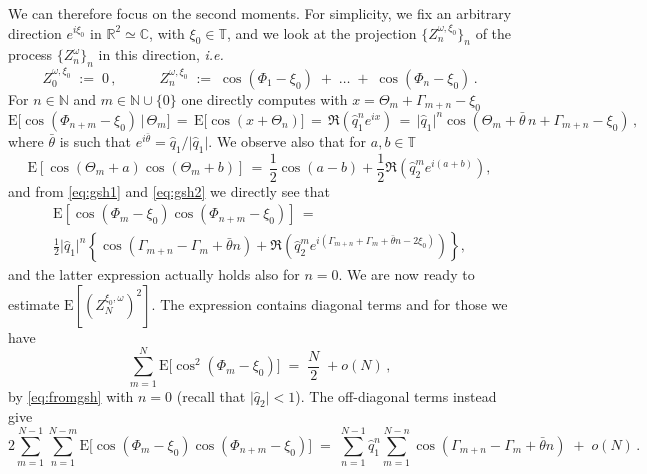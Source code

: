 \documentclass[a4paper,reqno,11pt]{amsart}
\numberwithin{equation}{section}
\newcommand{\bbT}{{\ensuremath{\mathbb T}} }
\newcommand{\go}{\omega}
\newcommand{\R}{\mathbb{R}}
\newcommand{\C}{\mathbb{C}}
\newcommand{\N}{\mathbb{N}}
\def\bE{\ensuremath{\bs{\mathrm{E}}}}
\def\bs{\boldsymbol}
\begin{document}
We can therefore focus on the second moments.
For simplicity, we fix an arbitrary direction $e^{i\xi_0}$
in $\R^2 \simeq \C$, with $\xi_0 \in \bbT$,
and we look at the projection
$\{Z^{\go, \xi_0}_n\}_n$ of the process $\{Z^\go_n\}_n$
in this direction, {\sl i.e.}
\begin{equation}
    Z^{\go, \xi_0}_0 \;:=\; 0\,  , \qquad \quad Z^{\go, \xi_0}_n \;:=\; \cos(\Phi_1 - \xi_0)
    \;+\; \ldots \;+\; \cos(\Phi_n-\xi_0)\,.
\end{equation}
For $n\in\N$ and $m\in \N\cup\{0\}$
one directly computes with $x=\Theta_m + \Gamma_{m+n}-\xi_0$
\begin{equation}
\label{eq:gsh1}
\bE \big[ \cos(\Phi_{n+m}-\xi_0) \,\big|\, \Theta_m \big] \,=\,
    \bE \big[ \cos(x+\Theta_n) \big]
    \,=\, \Re \left( \hat q_1^n e^{ix}\right) \, =\,
    \vert \hat q_1\vert ^n \cos(\Theta_m + \bar \theta \,n+ \Gamma_{m+n}-\xi_0)\,,
\end{equation}
where $\bar \theta$ is such that
$e^{i \bar \theta} = \hat q_1/\vert \hat q_1\vert$.
We observe also that for $a,b\in \bbT$
\begin{equation}
\label{eq:gsh2}
\bE \left[  \cos(\Theta_{m}+a)\cos(\Theta_{m}+b) \right] \,=\,
\frac 12 \cos (a-b) + \frac 12 \Re \left( \hat q_2^me^{i(a+b)}\right),
\end{equation}
and from \eqref{eq:gsh1} and  \eqref{eq:gsh2}  we directly see that
\begin{multline}
\label{eq:fromgsh}
\bE \left[  \cos (\Phi_m -\xi_0) \cos (\Phi_{n+m} -\xi_0)\right]\, =\\
\frac 12 \vert \hat q_1\vert^n
\left\{ \cos (\Gamma _{m+n}-\Gamma_m +\bar \theta n)
+ \Re \left( \hat q _2^m e^{i(\Gamma _{m+n} +
\Gamma_m +\bar \theta n -2\xi_0)}\right) \right\},
\end{multline}
and the latter expression actually holds also for $n=0$.
We are now ready to estimate $\bE[(Z_N^{\xi_0, \go})^2]$.
The expression contains diagonal terms and for those we have
\begin{equation}
    \sum_{m=1}^N \bE\big[ \cos^2(\Phi_m-\xi_0) \big] \;=\; \frac{N}{2}\; + o(N)\,,
\end{equation}
 by \eqref{eq:fromgsh} with $n=0$
(recall that $\vert \hat q_2 \vert <1$).
The off-diagonal terms instead give
\begin{equation}
    2\sum_{m=1}^{N-1} \sum_{n=1}^{N-m} \bE\big[ \cos(\Phi_m-\xi_0)
    \cos(\Phi_{n+m}-\xi_0) \big] \;=\;
    \sum_{n=1}^{N-1} \hat q_1^n \sum_{m=1}^{N-n} \cos(\Gamma_{m+n} - \Gamma_m+\bar \theta n) \;+\; o(N)\,.
\end{equation}
\end{document}
